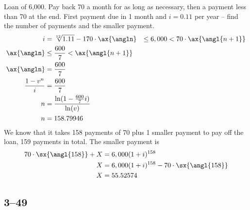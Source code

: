 \documentclass[a4paper, 12pt, reqno]{amsart}
\numberwithin{equation}{section}
\begin{document}
Loan of 6,000. Pay back 70 a month for as long as necessary, then a payment
less than 70 at the end. First payment due in 1 month and $i=0.11$ per year -- 
find the number of payments and the smaller payment.
\begin{equation}\nonumber
    \begin{aligned}
        i &= \sqrt[12]{1.11} - 1
        70 \cdot \ax{\angln} &\le 6,000 < 70 \cdot \ax{\angl{n+1}}    \\
        \ax{\angln} &\le \frac{600}{7} < \ax{\angl{n+1}}            \\
        \ax{\angln} &= \frac{600}{7}                                  \\
        \frac{1-v^n}{i} &= \frac{600}{7}       \\
        n &= \frac{\ln(1-\frac{600}{7}i)}{\ln(v)} \\
        n &= 158.79946
    \end{aligned}
\end{equation}
We know that it takes 158 payments of 70 plus 1 smaller payment to pay off the
loan, 159 payments in total. The smaller payment is
\begin{equation}\nonumber
    \begin{aligned}
        70 \cdot \sx{\angl{158}} + X &= 6,000(1+i)^{158}         \\
        X &= 6,000(1+i)^{158} - 70 \cdot \sx{\angl{158}}         \\
        X &= 55.52574
    \end{aligned}
\end{equation}

\subsection*{3--49}
\end{document}
